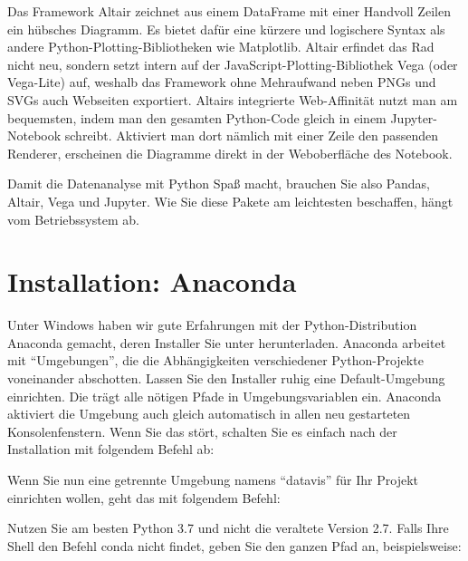 Das Framework Altair zeichnet aus einem DataFrame mit einer Handvoll Zeilen ein hübsches Diagramm. Es bietet dafür eine kürzere und logischere Syntax als andere Python-Plotting-Bibliotheken wie Matplotlib. Altair erfindet das Rad nicht neu, sondern setzt intern auf der JavaScript-Plotting-Bibliothek Vega (oder Vega-Lite) auf, weshalb das Framework ohne Mehraufwand neben PNGs und SVGs auch Webseiten exportiert. Altairs integrierte Web-Affinität nutzt man am bequemsten, indem man den gesamten Python-Code gleich in einem Jupyter-Notebook schreibt. Aktiviert man dort nämlich mit einer Zeile den passenden Renderer, erscheinen die Diagramme direkt in der Weboberfläche des Notebook.

Damit die Datenanalyse mit Python Spaß macht, brauchen Sie also Pandas, Altair, Vega und Jupyter. Wie Sie diese Pakete am leichtesten beschaffen, hängt vom Betriebssystem ab.

\section{Installation: Anaconda}

Unter Windows haben wir gute Erfahrungen mit der Python-Distribution Anaconda gemacht, deren Installer Sie unter  herunterladen. Anaconda arbeitet mit ``Umgebungen'', die die Abhängigkeiten verschiedener Python-Projekte voneinander abschotten. Lassen Sie den Installer ruhig eine Default-Umgebung einrichten. Die trägt alle nötigen Pfade in Umgebungsvariablen ein. Anaconda aktiviert die Umgebung auch gleich automatisch in allen neu gestarteten Konsolenfenstern. Wenn Sie das stört, schalten Sie es einfach nach der Installation mit folgendem Befehl ab:

\medskip


\medskip

Wenn Sie nun eine getrennte Umgebung namens ``datavis'' für Ihr Projekt einrichten wollen, geht das mit folgendem Befehl:

\medskip


\medskip


Nutzen Sie am besten Python 3.7 und nicht die veraltete Version 2.7. Falls Ihre Shell den Befehl conda nicht findet, geben Sie den ganzen Pfad an, beispielsweise:

\medskip

